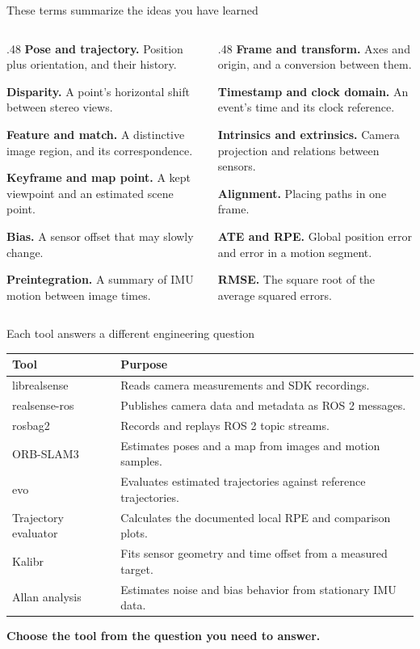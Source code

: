 \documentclass[aspectratio=169,12pt,t]{beamer}
\newcommand{\para}[1]{#1\par\medskip}
\newcommand{\lesson}[1]{\vfill{\color{teal!70!black}\bfseries #1}\par}
\newcommand{\twocol}[2]{\begin{columns}[T,onlytextwidth]\begin{column}{.48\textwidth}#1\end{column}\begin{column}{.48\textwidth}#2\end{column}\end{columns}}
\begin{document}
\begin{frame}{These terms summarize the ideas you have learned}

\twocol{
\para{\textbf{Pose and trajectory.} Position plus orientation, and their history.}
\para{\textbf{Disparity.} A point's horizontal shift between stereo views.}
\para{\textbf{Feature and match.} A distinctive image region, and its correspondence.}
\para{\textbf{Keyframe and map point.} A kept viewpoint and an estimated scene point.}
\para{\textbf{Bias.} A sensor offset that may slowly change.}
\para{\textbf{Preintegration.} A summary of IMU motion between image times.}
}{
\para{\textbf{Frame and transform.} Axes and origin, and a conversion between them.}
\para{\textbf{Timestamp and clock domain.} An event's time and its clock reference.}
\para{\textbf{Intrinsics and extrinsics.} Camera projection and relations between sensors.}
\para{\textbf{Alignment.} Placing paths in one frame.}
\para{\textbf{ATE and RPE.} Global position error and error in a motion segment.}
\para{\textbf{RMSE.} The square root of the average squared errors.}
}

\end{frame}

\begin{frame}{Each tool answers a different engineering question}

\begin{tabular}{@{}p{42mm}p{145mm}@{}}\toprule
\textbf{Tool} & \textbf{Purpose}\\\midrule
librealsense & Reads camera measurements and SDK recordings.\\[6pt]
realsense-ros & Publishes camera data and metadata as ROS 2 messages.\\[6pt]
rosbag2 & Records and replays ROS 2 topic streams.\\[6pt]
ORB-SLAM3 & Estimates poses and a map from images and motion samples.\\[6pt]
evo & Evaluates estimated trajectories against reference trajectories.\\[6pt]
Trajectory evaluator & Calculates the documented local RPE and comparison plots.\\[6pt]
Kalibr & Fits sensor geometry and time offset from a measured target.\\[6pt]
Allan analysis & Estimates noise and bias behavior from stationary IMU data.\\\bottomrule
\end{tabular}
\lesson{Choose the tool from the question you need to answer.}

\end{frame}
\end{document}
